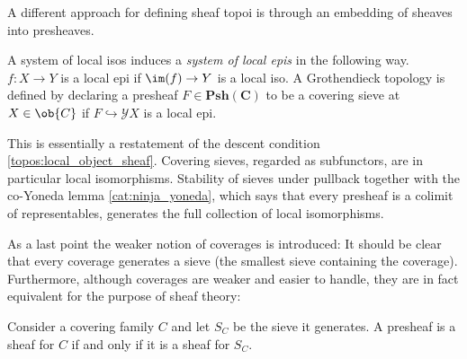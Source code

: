     A different approach for defining sheaf topoi is through an embedding of sheaves into presheaves.
    \begin{property}
        A system of local isos induces a \textit{system of local epis} in the following way. $f:X\rightarrow Y$ is a local epi if $\im(f)\rightarrow Y$ is a local iso. A Grothendieck topology is defined by declaring a presheaf $F\in\mathbf{Psh(C)}$ to be a covering sieve at $X\in\ob{C}$ if $F\hookrightarrow\mathcal{Y}X$ is a local epi.
    \end{property}

    \begin{remark}
        This is essentially a restatement of the descent condition \ref{topos:local_object_sheaf}. Covering sieves, regarded as subfunctors, are in particular local isomorphisms. Stability of sieves under pullback together with the co-Yoneda lemma \ref{cat:ninja_yoneda}, which says that every presheaf is a colimit of representables, generates the full collection of local isomorphisms.
    \end{remark}

    As a last point the weaker notion of coverages is introduced:
    It should be clear that every coverage generates a sieve (the smallest sieve containing the coverage). Furthermore, although coverages are weaker and easier to handle, they are in fact equivalent for the purpose of sheaf theory:
    \begin{property}
        Consider a covering family $C$ and let $S_C$ be the sieve it generates. A presheaf is a sheaf for $C$ if and only if it is a sheaf for $S_C$.
    \end{property}

